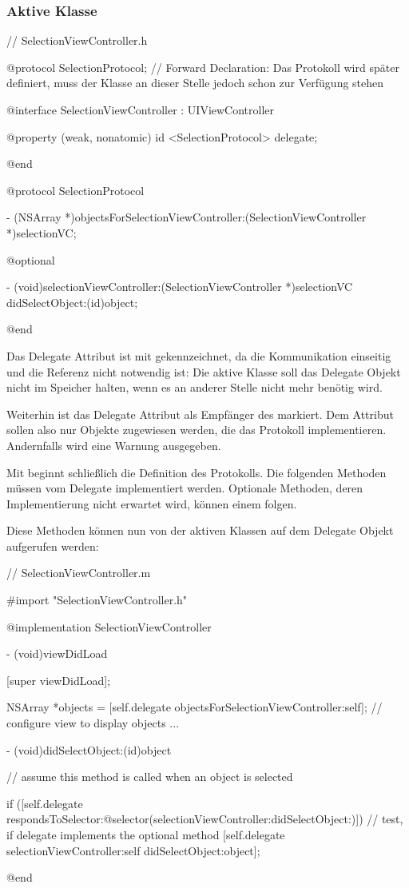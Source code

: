 \documentclass[parskip=half, final]{scrreprt}
\begin{document}
\subsubsection{Aktive Klasse}
\begin{objclst}
// SelectionViewController.h

@protocol SelectionProtocol; // Forward Declaration: Das Protokoll wird später definiert, muss der Klasse an dieser Stelle jedoch schon zur Verfügung stehen

@interface SelectionViewController : UIViewController

@property (weak, nonatomic) id <SelectionProtocol> delegate;

@end

@protocol SelectionProtocol

- (NSArray *)objectsForSelectionViewController:(SelectionViewController *)selectionVC;

@optional

- (void)selectionViewController:(SelectionViewController *)selectionVC didSelectObject:(id)object;

@end
\end{objclst}

Das Delegate Attribut ist mit  gekennzeichnet, da die Kommunikation einseitig und die Referenz nicht notwendig ist: Die aktive Klasse soll das Delegate Objekt nicht im Speicher halten, wenn es an anderer Stelle nicht mehr benötig wird.

Weiterhin ist das Delegate Attribut als Empfänger des  markiert. Dem Attribut sollen also nur Objekte zugewiesen werden, die das Protokoll implementieren. Andernfalls wird eine Warnung ausgegeben.

Mit  beginnt schließlich die Definition des Protokolls. Die folgenden Methoden müssen vom Delegate implementiert werden. Optionale Methoden, deren Implementierung nicht erwartet wird, können einem  folgen.

Diese Methoden können nun von der aktiven Klassen auf dem Delegate Objekt aufgerufen werden:

\begin{objclst}
// SelectionViewController.m

#import "SelectionViewController.h"

@implementation SelectionViewController

- (void)viewDidLoad {
    [super viewDidLoad];
    
    NSArray *objects = [self.delegate objectsForSelectionViewController:self];
    // configure view to display objects ...
    
}

- (void)didSelectObject:(id)object {
    // assume this method is called when an object is selected
    
    if ([self.delegate respondsToSelector:@selector(selectionViewController:didSelectObject:)]) { // test, if delegate implements the optional method
        [self.delegate selectionViewController:self didSelectObject:object];
    }
    
}

@end
\end{objclst}
\end{document}

